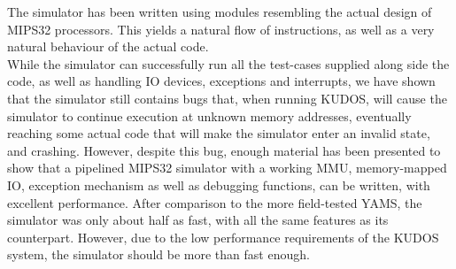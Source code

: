 The simulator has been written using modules resembling the actual design of
MIPS32 processors. This yields a natural flow of instructions, as well as a very natural
behaviour of the actual code.\\
While the simulator can successfully run all the test-cases supplied along side
the code, as well as handling IO devices, exceptions and interrupts, we have
shown that the simulator still contains bugs that, when running
KUDOS, will cause the simulator to continue execution at unknown memory addresses,
eventually reaching some actual code that will make the simulator enter an invalid
state, and crashing. However, despite this bug, enough material has been presented
to show that a pipelined MIPS32 simulator with a working MMU, memory-mapped IO,
exception mechanism as well as debugging functions, can be written, with excellent
performance. After comparison to the more field-tested YAMS, the simulator was
only about half as fast, with all the same features as its counterpart. However,
due to the low performance requirements of the KUDOS system, the simulator should
be more than fast enough.


